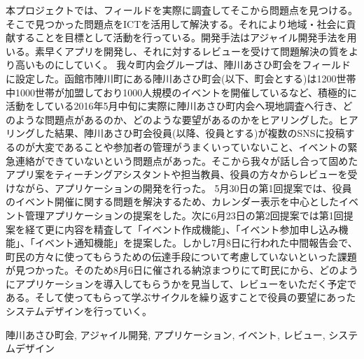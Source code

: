 \begin{jabstract}
\quad 本プロジェクトでは、フィールドを実際に調査してそこから問題点を見つける。そこで見つかった問題点をICTを活用して解決する。それにより地域・社会に貢献することを目標として活動を行っている。開発手法はアジャイル開発手法を用いる。素早くアプリを開発し、それに対するレビューを受けて問題解決の質をより高いものにしていく。
我々町内会グループは、陣川あさひ町会をフィールドに設定した。函館市陣川町にある陣川あさひ町会(以下、町会とする)は1200世帯中1000世帯が加盟しており1000人規模のイベントを開催しているなど、積極的に活動をしている2016年5月中旬に実際に陣川あさひ町内会へ現地調査へ行き、どのような問題点があるのか、どのような要望があるのかをヒアリングした。ヒアリングした結果、陣川あさひ町会役員(以降、役員とする)が複数のSNSに投稿するのが大変であることや参加者の管理がうまくいっていないこと、イベントの緊急連絡ができていないという問題点があった。そこから我々が話し合って固めたアプリ案をティーチングアシスタントや担当教員、役員の方々からレビューを受けながら、アプリケーションの開発を行った。
5月30日の第1回提案では、役員のイベント開催に関する問題を解決するため、カレンダー表示を中心としたイベント管理アプリケーションの提案をした。次に6月23日の第2回提案では第1回提案を経て更に内容を精査して「イベント作成機能」、「イベント参加申し込み機能」、「イベント通知機能」を提案した。しかし7月8日に行われた中間報告会で、
町民の方々に使ってもらうための伝達手段について考慮していないといった課題が見つかった。そのため8月6日に催される納涼まつりにて町民にから、どのようにアプリケーションを導入してもらうかを見当して、レビューをいただく予定である。そして使ってもらって学ぶサイクルを繰り返すことで役員の要望にあったシステムデザインを行っていく。

\begin{jkeyword}
陣川あさひ町会, アジャイル開発, アプリケーション, イベント, レビュー, システムデザイン
\end{jkeyword}
\end{jabstract}
​
